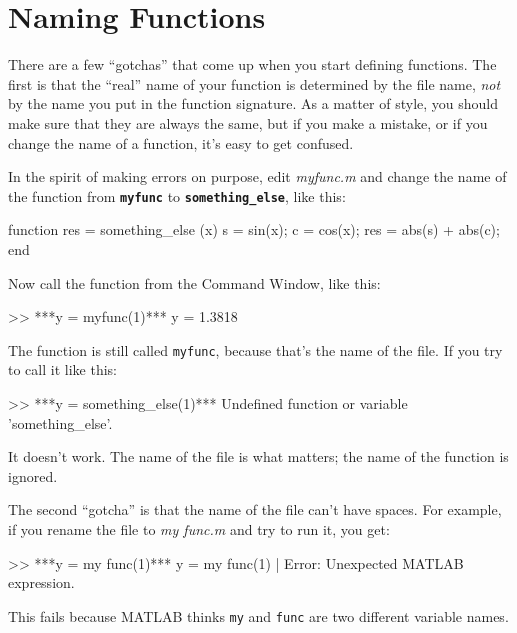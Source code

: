 
\section{Naming Functions}

There are a few ``gotchas'' that come up when you start defining functions.
The first is that the ``real'' name of your function is determined by the file name, \emph{not} by the name you put in the function signature.  As a matter of style, you
should make sure that they are always the same, but if you
make a mistake, or if you change the name of a function, it's
easy to get confused.


In the spirit of making errors on purpose, edit \emph{myfunc.m} and change the name of the function from \textbf{\lstinline{myfunc}} to \textbf{\lstinline{something_else}}, like this:

\begin{code}
function res = something_else (x)
    s = sin(x);
    c = cos(x);
    res = abs(s) + abs(c);
end
\end{code}

Now call the function from the Command Window, like this:

\begin{code}
>> ***y = myfunc(1)***
y = 1.3818
\end{code}

The function is still called \lstinline{myfunc}, because that's the name of the file.
If you try to call it like this:

\begin{code}
>> ***y = something_else(1)***
Undefined function or variable 'something_else'.
\end{code}

It doesn't work.  The name of the file is what matters; the name of the function is ignored.

The second ``gotcha'' is that the name of the file can't have spaces.
For example, if you rename the file to \emph{my func.m}
and try to run it, you get:

\begin{code}
>> ***y = my func(1)***
 y = my func(1)
        |
Error: Unexpected MATLAB expression.
\end{code}

This fails because MATLAB thinks \lstinline{my} and \lstinline{func} are two different
variable names.

